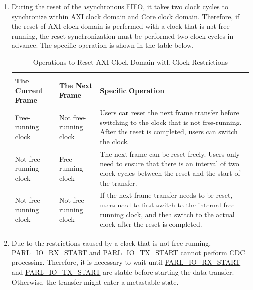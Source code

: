 \documentclass[main\_\_EN.tex]{subfiles}
\begin{document}
\begin{enumerate}
    \item During the reset of the asynchronous FIFO, it takes two clock cycles to synchronize within AXI clock domain and Core clock domain. Therefore, if the reset of AXI clock domain is performed with a clock that is not free-running, the reset synchronization must be performed two clock cycles in advance. The specific operation is shown in the table below.

\begin{table}[H]
    \centering
    \caption{Operations to Reset AXI Clock Domain with Clock Restrictions}
    \label{tab:parlio-reset-clk-restriction}

    \begin{tabular}{|l|l|p{9cm}|}
    \hline
        \rowcolor{lightgray}
        \multicolumn{2}{|c|}{\textbf{Clock Restriction}} & \\
        \rowcolor{lightgray}
        \textbf{The Current Frame} & \textbf{The Next Frame} & \multirow{-2}{*}{\textbf{Specific Operation}} \\ \hline

        Free-running clock    & Not free-running clock  & Users can reset the next frame transfer before switching to the clock that is not free-running. After the reset is completed, users can switch the clock.    \\ \hline
        Not free-running clock  & Free-running clock    & The next frame can be reset freely. Users only need to ensure that there is an interval of two clock cycles between the reset and the start of the transfer.     \\ \hline
        Not free-running clock  & Not free-running clock  & If the next frame transfer needs to be reset, users need to first switch to the internal free-running clock, and then switch to the actual clock after the reset is completed.      \\ \hline
    \end{tabular}
\end{table}

    \item Due to the restrictions caused by a clock that is not free-running, \hyperref[fielddesc:PARLIORXSTART]{PARL\_IO\_RX\_START} and \hyperref[fielddesc:PARLIOTXSTART]{PARL\_IO\_TX\_START} cannot perform CDC processing. Therefore, it is necessary to wait until \hyperref[fielddesc:PARLIORXSTART]{PARL\_IO\_RX\_START} and \hyperref[fielddesc:PARLIOTXSTART]{PARL\_IO\_TX\_START} are stable before starting the data transfer. Otherwise, the transfer might enter a metastable state.


\end{enumerate}
\end{document}
